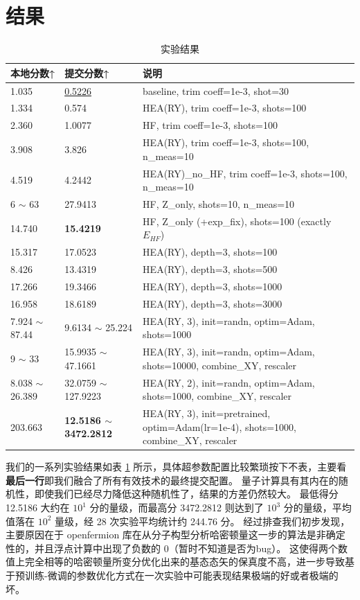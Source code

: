 \documentclass[withoutpreface,bwprint]{cumcmthesis}
\begin{document}
\section{结果}

\begin{table}[h!]
	\centering
	\caption{实验结果}
	\begin{tabular}{lll}
		\textbf{本地分数↑} & \textbf{提交分数↑} & \textbf{说明} \\
		\hline
		1.035 & \underline{0.5226} & baseline, trim coeff=1e-3, shot=30 \\
		1.334 & 0.574  & HEA(RY), trim coeff=1e-3, shots=100 \\
		2.360 & 1.0077 & HF, trim coeff=1e-3, shots=100 \\
		3.908 & 3.826  & HEA(RY), trim coeff=1e-3, shots=100, n\_meas=10 \\
		4.519 & 4.2442 & HEA(RY)\_no\_HF, trim coeff=1e-3, shots=100, n\_meas=10 \\
		6 $ \sim $ 63 & 27.9413 & HF, Z\_only, shots=10, n\_meas=10 \\
		14.740 & \textbf{15.4219} & HF, Z\_only (+exp\_fix), shots=100 (exactly $E_{HF}$) \\
		15.317 & 17.0523 & HEA(RY), depth=3, shots=100 \\
		 8.426 & 13.4319 & HEA(RY), depth=3, shots=500 \\
		17.266 & 19.3466 & HEA(RY), depth=3, shots=1000 \\
		16.958 & 18.6189 & HEA(RY), depth=3, shots=3000 \\
		7.924 $ \sim $ 87.44 & 9.6134 $ \sim $ 25.224 & HEA(RY, 3), init=randn, optim=Adam, shots=1000 \\
		9 $ \sim $ 33 & 15.9935 $ \sim $ 47.1661 & HEA(RY, 3), init=randn, optim=Adam, shots=10000, combine\_XY, rescaler \\
		8.038 $ \sim $ 26.389 & 32.0759 $ \sim $ 127.9223 & HEA(RY, 2), init=randn, optim=Adam, shots=1000, combine\_XY, rescaler \\
		203.663 & \textbf{12.5186 $ \sim $ 3472.2812} & HEA(RY, 3), init=pretrained, optim=Adam(lr=1e-4), shots=1000, combine\_XY, rescaler \\
	\end{tabular}
	\label{tbl:result}
\end{table}

我们的一系列实验结果如表 \ref{tbl:result} 所示，具体超参数配置比较繁琐按下不表，主要看\textbf{最后一行}即我们融合了所有有效技术的最终提交配置。
量子计算具有其内在的随机性，即使我们已经尽力降低这种随机性了，结果的方差仍然较大。
最低得分 12.5186 大约在 $ 10^1 $ 分的量级，而最高分 3472.2812 则达到了 $ 10^3 $ 分的量级，平均值落在 $ 10^2 $ 量级，经 28 次实验平均统计约 244.76 分。
经过排查我们初步发现，主要原因在于 openfermion 库在从分子构型分析哈密顿量这一步的算法是非确定性的，并且浮点计算中出现了负数的 0（暂时不知道是否为bug）。
这使得两个数值上完全相等的哈密顿量所变分优化出来的基态态矢的保真度不高，进一步导致基于预训练-微调的参数优化方式在一次实验中可能表现结果极端的好或者极端的坏。
\end{document}
